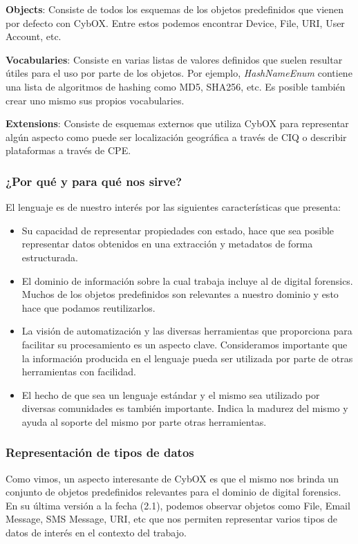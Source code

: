 \textbf{Objects}: Consiste de todos los esquemas de los objetos predefinidos que vienen por defecto con CybOX. Entre estos podemos encontrar Device, File, URI, User Account, etc.

\textbf{Vocabularies}: Consiste en varias listas de valores definidos que suelen resultar útiles para el uso por parte de los objetos. Por ejemplo, \emph{HashNameEnum} contiene una lista de algoritmos de hashing como MD5, SHA256, etc. Es posible también crear uno mismo sus propios vocabularies.

\textbf{Extensions}: Consiste de esquemas externos que utiliza CybOX para representar algún aspecto como puede ser localización geográfica a través de CIQ o describir plataformas a través de CPE.

\subsubsection{¿Por qué y para qué nos sirve?}
El lenguaje es de nuestro interés por las siguientes características que presenta:

\begin{itemize}
\item Su capacidad de representar propiedades con estado, hace que sea posible representar datos obtenidos en una extracción y metadatos de forma estructurada.
\item El dominio de información sobre la cual trabaja incluye al de digital forensics. Muchos de los objetos predefinidos son relevantes a nuestro dominio y esto hace que podamos reutilizarlos.
\item La visión de automatización y las diversas herramientas que proporciona para facilitar su procesamiento es un aspecto clave. Consideramos importante que la información producida en el lenguaje pueda ser utilizada por parte de otras herramientas con facilidad.
\item El hecho de que sea un lenguaje estándar y el mismo sea utilizado por diversas comunidades es también importante. Indica la madurez del mismo y ayuda al soporte del mismo por parte otras herramientas.
\end{itemize}

\subsubsection{Representación de tipos de datos}
Como vimos, un aspecto interesante de CybOX es que el mismo nos brinda un conjunto de objetos predefinidos relevantes para el dominio de digital forensics. En su última versión a la fecha (2.1), podemos observar objetos como File, Email Message, SMS Message, URI, etc que nos permiten representar varios tipos de datos de interés en el contexto del trabajo.

